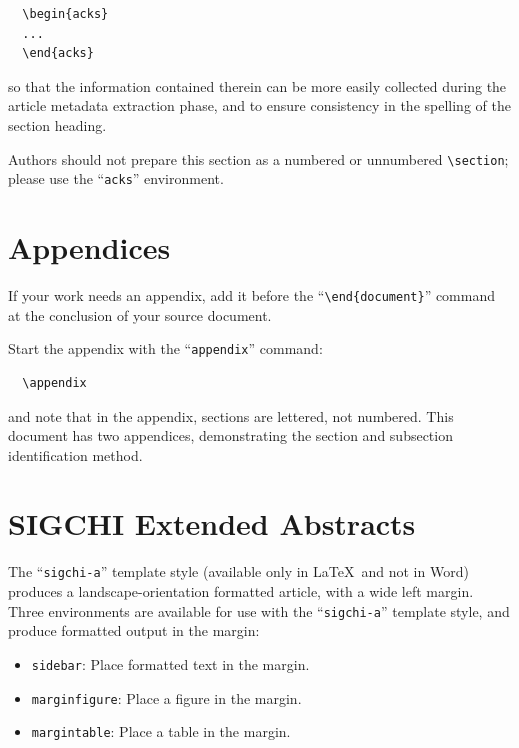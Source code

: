 \documentclass[
acmsmall,
nonacm,
screen,
acmthm]{../templates/acmart}
\begin{document}
\begin{verbatim}
  \begin{acks}
  ...
  \end{acks}
\end{verbatim}

so that the information contained therein can be more easily collected
during the article metadata extraction phase, and to ensure consistency
in the spelling of the section heading.

Authors should not prepare this section as a numbered or unnumbered
\texttt{\textbackslash{}section}; please use the ``\texttt{acks}''
environment.

\hypertarget{appendices}{%
\section{Appendices}\label{appendices}}

If your work needs an appendix, add it before the
``\texttt{\textbackslash{}end\{document\}}'' command at the conclusion
of your source document.

Start the appendix with the ``\texttt{appendix}'' command:

\begin{verbatim}
  \appendix
\end{verbatim}

and note that in the appendix, sections are lettered, not numbered. This
document has two appendices, demonstrating the section and subsection
identification method.

\hypertarget{sigchi-extended-abstracts}{%
\section{SIGCHI Extended Abstracts}\label{sigchi-extended-abstracts}}

The ``\texttt{sigchi-a}'' template style (available only in LaTeX~and
not in Word) produces a landscape-orientation formatted article, with a
wide left margin. Three environments are available for use with the
``\texttt{sigchi-a}'' template style, and produce formatted output in
the margin:

\begin{itemize}
\item
  \texttt{sidebar}: Place formatted text in the margin.
\item
  \texttt{marginfigure}: Place a figure in the margin.
\item
  \texttt{margintable}: Place a table in the margin.
\end{itemize}
\end{document}
